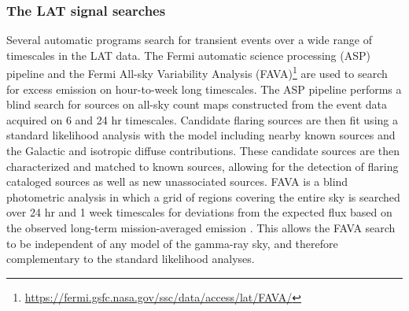 \documentclass{aastex61}
\begin{document}
\subsubsection{The LAT signal searches}
Several automatic programs search for transient events over a wide range of timescales in the LAT data. The Fermi automatic science processing (ASP) pipeline and the Fermi All-sky Variability Analysis (FAVA)\footnote{\url{https://fermi.gsfc.nasa.gov/ssc/data/access/lat/FAVA/}} are used to search for excess emission on hour-to-week long timescales. The ASP pipeline performs a blind search for sources on all-sky count maps constructed from the event data acquired on 6 and 24 hr timescales. Candidate flaring sources are then fit using a standard likelihood analysis with the model including nearby known sources and the Galactic and isotropic diffuse contributions. These candidate sources are then characterized and matched to known sources, allowing for the detection of flaring cataloged sources as well as new unassociated sources.  FAVA is a blind photometric analysis in which a grid of regions covering the entire sky is searched over 24 hr and 1 week timescales for deviations from the expected flux based on the observed long-term mission-averaged emission \citep{Ackermann13}. This allows the FAVA search to be independent of any model of the gamma-ray sky, and therefore complementary to the standard likelihood analyses.
\end{document}
